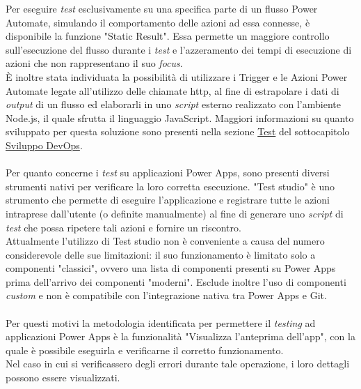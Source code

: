 \noindent Per eseguire \emph{test} esclusivamente su una specifica parte di un flusso Power Automate, simulando il comportamento delle azioni ad essa connesse, è disponibile la funzione "Static Result". Essa permette un maggiore controllo sull'esecuzione del flusso durante i \emph{test} e l'azzeramento dei tempi di esecuzione di azioni che non rappresentano il suo \emph{focus}.\\
È inoltre stata individuata la possibilità di utilizzare i Trigger e le Azioni Power Automate legate all'utilizzo delle chiamate \gls{http}, al fine di estrapolare i dati di \emph{output} di un flusso ed elaborarli in uno \emph{script} esterno realizzato con l'ambiente Node.js, il quale sfrutta il linguaggio JavaScript. Maggiori informazioni su quanto sviluppato per questa soluzione sono presenti nella sezione \hyperref[testProgrammazione]{Test} del sottocapitolo \hyperref[Sviluppo DevOps]{Sviluppo DevOps}.\\\\
Per quanto concerne i \emph{test} su applicazioni Power Apps, sono presenti diversi strumenti nativi per verificare la loro corretta esecuzione. "Test studio" è uno strumento che permette di eseguire l'applicazione e registrare tutte le azioni intraprese dall'utente (o definite manualmente) al fine di generare uno \emph{script} di \emph{test} che possa ripetere tali azioni e fornire un riscontro.\\
Attualmente l'utilizzo di Test studio non è conveniente a causa del numero considerevole delle sue limitazioni:
il suo funzionamento è limitato solo a componenti "classici", ovvero una lista di componenti presenti su Power Apps prima dell'arrivo dei componenti "moderni". Esclude inoltre l'uso di componenti \emph{custom} e non è compatibile con l'integrazione nativa tra Power Apps e Git.\\\\
Per questi motivi la metodologia identificata per permettere il \emph{testing} ad applicazioni Power Apps è la funzionalità "Visualizza l'anteprima dell'app", con la quale è possibile eseguirla e verificarne il corretto funzionamento.\\
Nel caso in cui si verificassero degli errori durante tale operazione, i loro dettagli possono essere visualizzati. 

